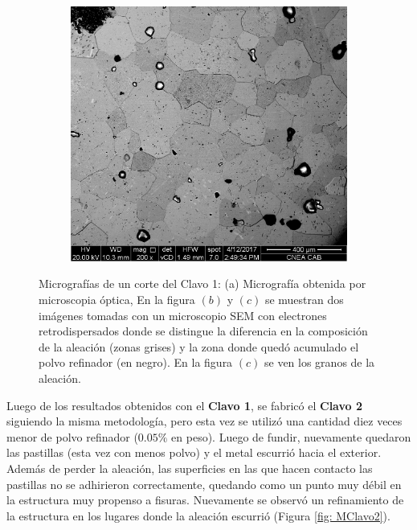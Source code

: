 \documentclass[a4paper,12pt,fleqn,twoside,openany]{book}
\begin{document}
\begin{figure}
\begin{subfigure}{0.3\textwidth}
        \caption{}%
        \label{fig: SEM1Clavo1}
    \end{subfigure}
        \begin{subfigure}{0.3\textwidth}
        \includegraphics[width=\textwidth]{Img/Resultados/clavos/Clavo1Retro2.jpg}
        \caption{}%
        \label{fig: Sem2Clavo1}
    \end{subfigure}
    \caption{Micrografías de un corte del Clavo 1: (a) Micrografía obtenida por microscopia óptica, En la figura $(b)$ y $(c)$ se muestran dos imágenes tomadas con un microscopio SEM con electrones retrodispersados donde se distingue la diferencia en la composición de la aleación (zonas grises) y la zona donde quedó acumulado el polvo refinador (en negro). En la figura $(c)$ se ven los granos de la aleación. }
    \end{figure}

Luego de los resultados obtenidos con el \textbf{Clavo 1}, se fabricó el \textbf{Clavo 2} siguiendo la misma metodología, pero esta vez se utilizó una cantidad diez veces menor de polvo refinador ($0.05\%$ en peso). Luego de fundir, nuevamente quedaron las pastillas (esta vez con menos polvo) y el metal escurrió hacia el exterior. Además de perder la aleación, las superficies en las que hacen contacto las pastillas no se adhirieron correctamente, quedando como un punto muy débil en la estructura muy propenso a fisuras. Nuevamente se observó un refinamiento de la estructura en los lugares donde la aleación escurrió (Figura \ref{fig: MClavo2}).
\end{document}
